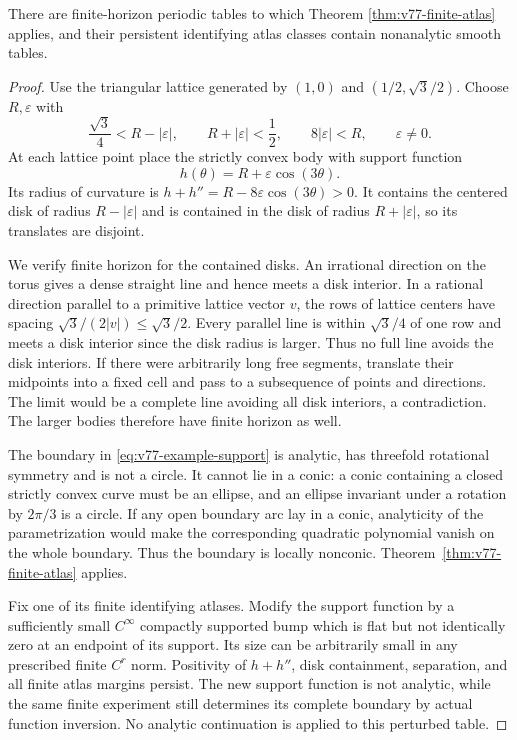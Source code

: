 \begin{proposition}
\label{prop:v77-example}
There are finite-horizon periodic tables to which Theorem
\ref{thm:v77-finite-atlas} applies, and their persistent identifying
atlas classes contain nonanalytic smooth tables.
\end{proposition}
\begin{proof}
Use the triangular lattice generated by $(1,0)$ and
$(1/2,\sqrt3/2)$.  Choose $R,\varepsilon$ with
\[
 \frac{\sqrt3}{4}<R-|\varepsilon|,
 \qquad R+|\varepsilon|<\frac12,
 \qquad 8|\varepsilon|<R,
 \qquad \varepsilon\ne0.
\]
At each lattice point place the strictly convex body with support
function
\begin{equation}\label{eq:v77-example-support}
 h(\theta)=R+\varepsilon\cos(3\theta).
\end{equation}
Its radius of curvature is $h+h''=R-8\varepsilon\cos(3\theta)>0$.
It contains the centered disk of radius $R-|\varepsilon|$ and is
contained in the disk of radius $R+|\varepsilon|$, so its translates
are disjoint.

We verify finite horizon for the contained disks.  An irrational
direction on the torus gives a dense straight line and hence meets a
disk interior.  In a rational direction parallel to a primitive lattice
vector $v$, the rows of lattice centers have spacing
$\sqrt3/(2|v|)\le\sqrt3/2$.  Every parallel line is within
$\sqrt3/4$ of one row and meets a disk interior since the disk radius
is larger.  Thus no full line avoids the disk interiors.  If there were
arbitrarily long free segments, translate their midpoints into a fixed
cell and pass to a subsequence of points and directions.  The limit
would be a complete line avoiding all disk interiors, a contradiction.
The larger bodies therefore have finite horizon as well.

The boundary in \eqref{eq:v77-example-support} is analytic, has
threefold rotational symmetry and is not a circle.  It cannot lie in
a conic: a conic containing a closed strictly convex curve must be an
ellipse, and an ellipse invariant under a rotation by $2\pi/3$ is a
circle.  If any open boundary arc lay in a conic, analyticity of the
parametrization would make the corresponding quadratic polynomial
vanish on the whole boundary.  Thus the boundary is locally nonconic.
Theorem~\ref{thm:v77-finite-atlas} applies.

Fix one of its finite identifying atlases.  Modify the support function
by a sufficiently small $C^\infty$ compactly supported bump which is
flat but not identically zero at an endpoint of its support.  Its size
can be arbitrarily small in any prescribed finite $C^r$ norm.  Positivity
of $h+h''$, disk containment, separation, and all finite atlas margins
persist.  The new support function is not analytic, while the same
finite experiment still determines its complete boundary by actual
function inversion.  No analytic continuation is applied to this
perturbed table.
\end{proof}
